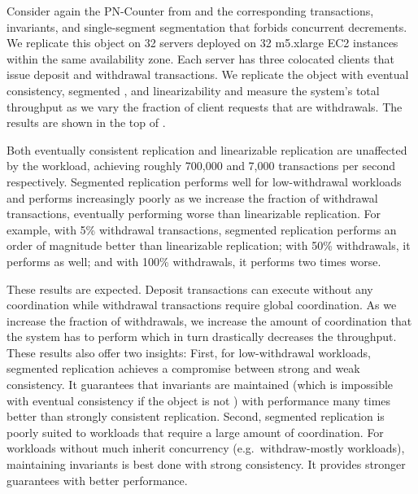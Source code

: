 \begin{benchmark}
Consider again the PN-Counter from  and the
corresponding transactions, invariants, and single-segment segmentation that
forbids concurrent decrements. We replicate this object on 32 servers
deployed on 32 m5.xlarge EC2 instances within the same availability zone.  Each
server has three colocated clients that issue deposit and withdrawal
transactions. We replicate the object with eventual consistency, segmented
\invariantconfluence{}, and linearizability and measure the system's total
throughput as we vary the fraction of client requests that are withdrawals. The
results are shown in the top of .

Both eventually consistent replication and linearizable replication are
unaffected by the workload, achieving roughly 700,000 and 7,000 transactions
per second respectively.
%
%
Segmented \invariantconfluent{} replication performs well for low-withdrawal
workloads and performs increasingly poorly as we increase the fraction of
withdrawal transactions, eventually performing worse than linearizable
replication. For example, with 5\% withdrawal transactions, segmented
\invariantconfluent{} replication performs an order of magnitude better than
linearizable replication; with 50\% withdrawals, it performs as well; and with
100\% withdrawals, it performs two times worse.

These results are expected. Deposit transactions can execute without any
coordination while withdrawal transactions require global coordination. As we
increase the fraction of withdrawals, we increase the amount of coordination
that the system has to perform which in turn drastically decreases the
throughput. These results also offer two insights:
%
First, for low-withdrawal workloads, segmented \invariantconfluent{} replication
achieves a compromise between strong and weak consistency. It guarantees that
invariants are maintained (which is impossible with eventual consistency if the
object is not \invariantconfluent{}) with performance many times better than
strongly consistent replication.
%
Second, segmented \invariantconfluent{} replication is poorly suited to workloads
that require a large amount of coordination. For workloads without much inherit
concurrency (e.g.\ withdraw-mostly workloads), maintaining invariants is best
done with strong consistency. It provides stronger guarantees with better
performance.
\end{benchmark}

